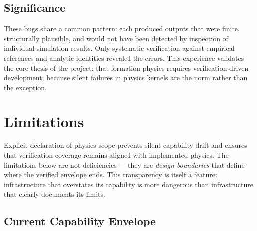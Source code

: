 \documentclass[11pt,twoside]{article}
\begin{document}
\subsection{Significance}

These bugs share a common pattern: each produced outputs that were finite, structurally plausible, and would not have been detected by inspection of individual simulation results. Only systematic verification against empirical references and analytic identities revealed the errors. This experience validates the core thesis of the project: that formation physics requires verification-driven development, because silent failures in physics kernels are the norm rather than the exception.


\section{Limitations}
\label{sec:limitations}

Explicit declaration of physics scope prevents silent capability drift and ensures that verification coverage remains aligned with implemented physics. The limitations below are not deficiencies --- they are \emph{design boundaries} that define where the verified envelope ends. This transparency is itself a feature: infrastructure that overstates its capability is more dangerous than infrastructure that clearly documents its limits.

\subsection{Current Capability Envelope}
\end{document}
